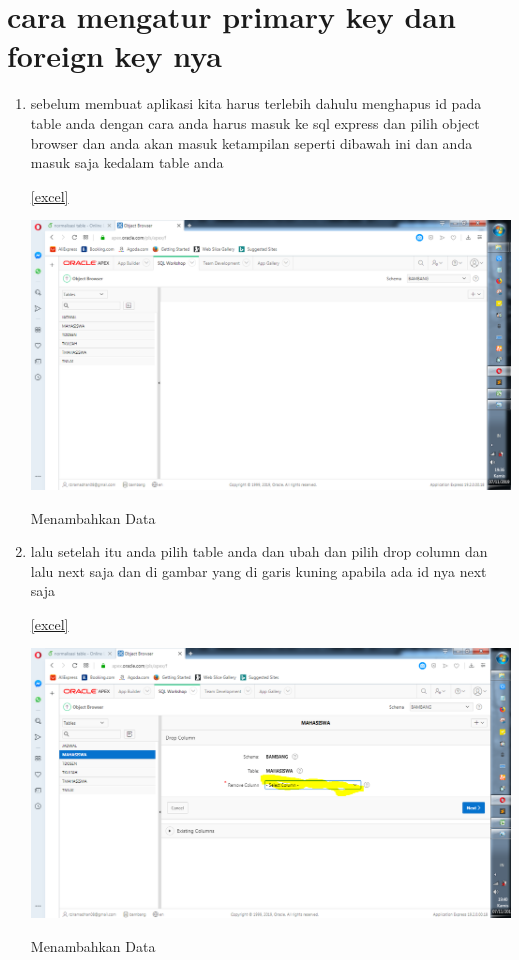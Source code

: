\documentclass{article}
\begin{document}
\section{cara mengatur primary key dan foreign key nya}
 \begin{enumerate}
    \item sebelum membuat aplikasi kita harus terlebih dahulu menghapus id pada table anda dengan cara anda harus masuk ke sql express dan pilih object browser dan anda akan masuk ketampilan seperti dibawah ini dan anda masuk saja kedalam table anda
    

    \ref{excel}
    \begin{center}
         \centering
            \includegraphics[scale=0.27]{gambar/12.PNG}
        \caption{Menambahkan Data}
        \label{excel}
    \end{center}

    \item lalu setelah itu anda pilih   table anda dan ubah dan pilih drop column dan lalu next saja dan di gambar yang di garis kuning apabila ada id nya next saja
    

    \ref{excel}
    \begin{center}
         \centering
            \includegraphics[scale=0.27]{gambar/13.png}
        \caption{Menambahkan Data}
        \label{excel}
    \end{center}
    

\end{enumerate}
\end{document}
